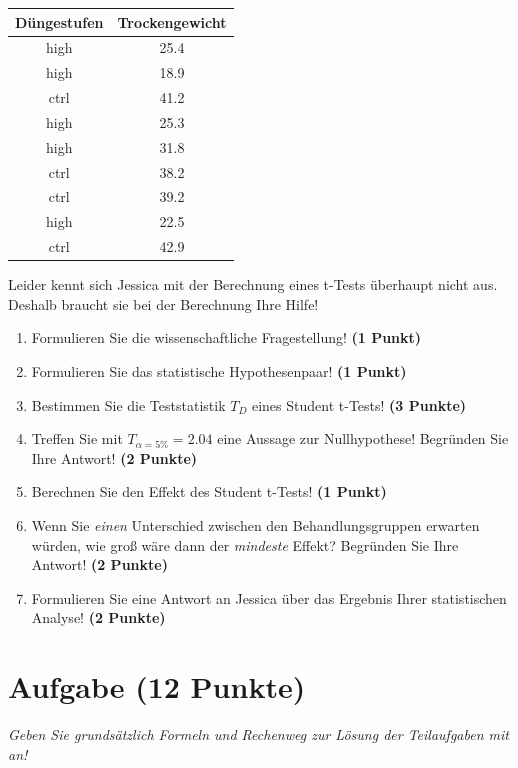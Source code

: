 \documentclass[a4paper, 9pt]{scrartcl}\usepackage[]{graphicx}\usepackage[]{xcolor}
\begin{document}
\begin{table}[!h]
\centering
\begin{tabular}{cc}
\toprule
Düngestufen & Trockengewicht\\
\midrule
high & 25.4\\
high & 18.9\\
ctrl & 41.2\\
high & 25.3\\
high & 31.8\\
\addlinespace
ctrl & 38.2\\
ctrl & 39.2\\
high & 22.5\\
ctrl & 42.9\\
\bottomrule
\end{tabular}
\end{table}



Leider kennt sich Jessica mit der Berechnung eines t-Tests überhaupt nicht aus. Deshalb braucht sie bei der Berechnung Ihre Hilfe!

\begin{enumerate}
  \item Formulieren Sie die wissenschaftliche Fragestellung! \textbf{(1 Punkt)}
  \item Formulieren Sie das statistische Hypothesenpaar! \textbf{(1 Punkt)}
  \item Bestimmen Sie die Teststatistik $T_{D}$ eines Student t-Tests! \textbf{(3 Punkte)}
\item Treffen Sie mit $T_{\alpha = 5\%} = 2.04$ eine Aussage zur Nullhypothese! Begründen Sie Ihre Antwort! \textbf{(2 Punkte)}
\item Berechnen Sie den Effekt des Student t-Tests! \textbf{(1 Punkt)}
\item Wenn Sie \textit{einen} Unterschied zwischen den Behandlungsgruppen erwarten würden, wie groß wäre dann der \textit{mindeste} Effekt? Begründen Sie Ihre Antwort! \textbf{(2 Punkte)}
\item Formulieren Sie eine Antwort an Jessica über das Ergebnis Ihrer statistischen Analyse! \textbf{(2 Punkte)}
\end{enumerate} 
\clearpage

\section{Aufgabe \hfill (12 Punkte)}

\textit{Geben Sie grundsätzlich Formeln und Rechenweg zur Lösung der Teilaufgaben mit an!} \\[1Ex]
 
\end{document}
